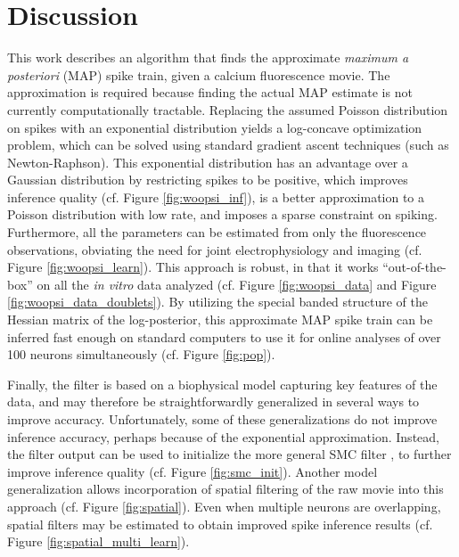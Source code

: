 \section{Discussion} \label{sec:dis}



This work describes an algorithm that finds the approximate \emph{maximum a posteriori} (MAP) spike train, given a calcium fluorescence movie.  The approximation is required because finding the actual MAP estimate is not currently computationally tractable.  Replacing the assumed Poisson distribution on spikes with an exponential distribution yields a log-concave optimization problem, which can be solved using standard gradient ascent techniques (such as Newton-Raphson).  This exponential distribution has an advantage over a Gaussian distribution by restricting spikes to be positive, which improves inference quality (cf. Figure \ref{fig:woopsi_inf}), is a better approximation to a Poisson distribution with low rate, and imposes a sparse constraint on spiking. Furthermore,  all the parameters can be estimated from only the fluorescence observations, obviating the need for joint electrophysiology and imaging (cf. Figure \ref{fig:woopsi_learn}).  This approach is robust, in that it works ``out-of-the-box'' on all the \emph{in vitro}  data analyzed (cf. Figure \ref{fig:woopsi_data} and Figure \ref{fig:woopsi_data_doublets}). By utilizing the special banded structure of the Hessian matrix of the log-posterior, this approximate MAP spike train can be inferred fast enough on standard computers to use it for online analyses of over 100 neurons simultaneously (cf. Figure \ref{fig:pop}).


Finally, the \foopsi filter is based on a biophysical model capturing key features of the data, and may therefore be straightforwardly generalized in several ways to improve accuracy.  Unfortunately, some of these generalizations do not improve inference accuracy, perhaps because of the exponential approximation.  Instead, the \foopsi filter output can be used to initialize the more general SMC filter \cite{VogelsteinPaninski09}, to further improve inference quality (cf. Figure \ref{fig:smc_init}).  Another model generalization allows incorporation of spatial filtering of the raw movie into this approach (cf. Figure \ref{fig:spatial}). Even when multiple neurons are overlapping, spatial filters may be estimated to obtain improved spike inference results (cf. Figure \ref{fig:spatial_multi_learn}).

